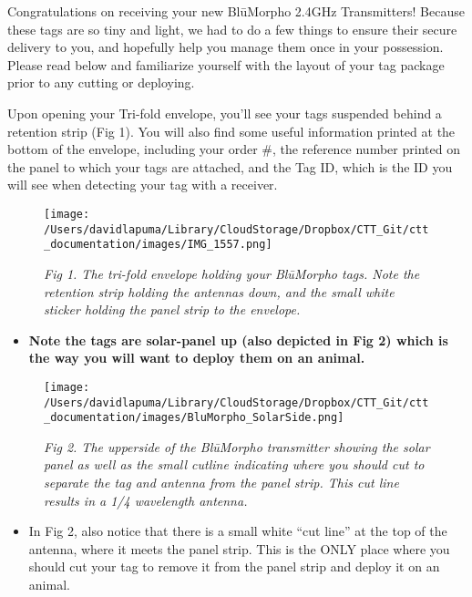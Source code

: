 \documentclass[
]{article}
\providecommand{\tightlist}{%
  \setlength{\itemsep}{0pt}\setlength{\parskip}{0pt}}
\begin{document}
Congratulations on receiving your new BlūMorpho 2.4GHz Transmitters!
Because these tags are so tiny and light, we had to do a few things to
ensure their secure delivery to you, and hopefully help you manage them
once in your possession. Please read below and familiarize yourself with
the layout of your tag package prior to any cutting or deploying.

Upon opening your Tri-fold envelope, you'll see your tags suspended
behind a retention strip (Fig 1). You will also find some useful
information printed at the bottom of the envelope, including your order
\#, the reference number printed on the panel to which your tags are
attached, and the Tag ID, which is the ID you will see when detecting
your tag with a receiver.

\begin{figure}
\hypertarget{id}{%
\centering
\texttt{[image: /Users/davidlapuma/Library/CloudStorage/Dropbox/CTT\_Git/ctt\_documentation/images/IMG\_1557.png]}
\caption{\emph{Fig 1. The tri-fold envelope holding your BlūMorpho tags.
Note the retention strip holding the antennas down, and the small white
sticker holding the panel strip to the envelope.}}\label{id}
}
\end{figure}

\begin{itemize}
\tightlist
\item
  \textbf{Note the tags are solar-panel up (also depicted in Fig 2)
  which is the way you will want to deploy them on an animal. }
\end{itemize}

\begin{figure}
\hypertarget{id}{%
\centering
\texttt{[image: /Users/davidlapuma/Library/CloudStorage/Dropbox/CTT\_Git/ctt\_documentation/images/BluMorpho\_SolarSide.png]}
\caption{\emph{Fig 2. The upperside of the BlūMorpho transmitter showing
the solar panel as well as the small cutline indicating where you should
cut to separate the tag and antenna from the panel strip. This cut line
results in a 1/4 wavelength antenna.}}\label{id}
}
\end{figure}

\begin{itemize}
\tightlist
\item
  In Fig 2, also notice that there is a small white ``cut line'' at the
  top of the antenna, where it meets the panel strip. This is the ONLY
  place where you should cut your tag to remove it from the panel strip
  and deploy it on an animal.
\end{itemize}
\end{document}
